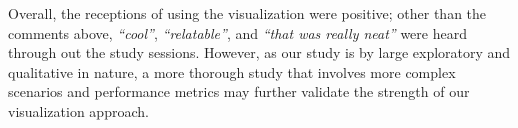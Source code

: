 Overall, the receptions of using the visualization were positive; other than the
comments above, \emph{``cool''}, \emph{``relatable''}, and \emph{``that
was really neat''} were heard through out the study sessions. However, as our
study is by large exploratory and qualitative in nature, a more thorough study
that involves more complex scenarios and performance metrics may further
validate the strength of our visualization approach.


  